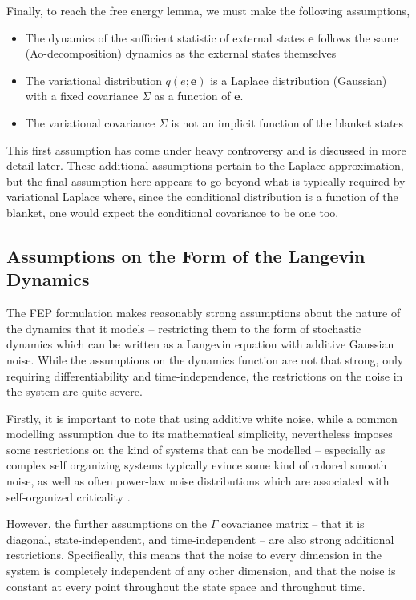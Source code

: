 Finally, to reach the free energy lemma, we must make the following assumptions,
\begin{itemize}
    \item The dynamics of the sufficient statistic of external states $\boldsymbol{e}$ follows the same (Ao-decomposition) dynamics as the external states themselves
    \item The variational distribution $q(e;\boldsymbol{e})$ is a Laplace distribution (Gaussian) with a fixed covariance $\Sigma$ as a function of $\boldsymbol{e}$.
    \item The variational covariance $\Sigma$ is not an implicit function of the blanket states
\end{itemize}
This first assumption has come under heavy controversy and is discussed in more detail later. These additional assumptions pertain to the Laplace approximation, but the final assumption here appears to go beyond what is typically required by variational Laplace where, since the conditional distribution is a function of the blanket, one would expect the conditional covariance to be one too.

\subsection{Assumptions on the Form of the Langevin Dynamics}

The FEP formulation makes reasonably strong assumptions about the nature of the dynamics that it models -- restricting them to the form of stochastic dynamics which can be written as a Langevin equation with additive Gaussian noise. While the assumptions on the dynamics function are not that strong, only requiring differentiability and time-independence, the restrictions on the noise in the system are quite severe.

Firstly, it is important to note that using additive white noise, while a common modelling assumption due to its mathematical simplicity, nevertheless imposes some restrictions on the kind of systems that can be modelled -- especially as complex self organizing systems typically evince some kind of colored smooth noise, as well as often power-law noise distributions which are associated with self-organized criticality \citep{ovchinnikov2016introduction}.

However, the further assumptions on the $\Gamma$ covariance matrix -- that it is diagonal, state-independent, and time-independent -- are also strong additional restrictions. Specifically, this means that the noise to every dimension in the system is completely independent of any other dimension, and that the noise is constant at every point throughout the state space and throughout time.
